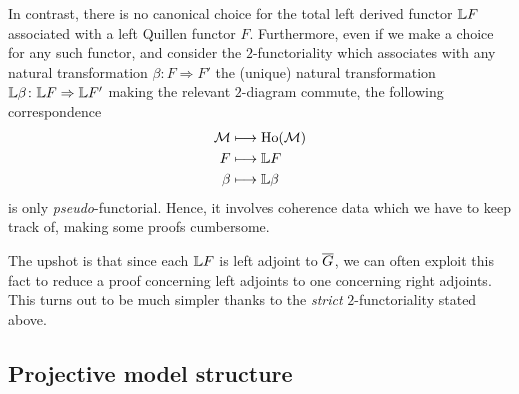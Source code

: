 \begin{paragr}
  In contrast, there is no canonical choice for the total left derived functor $\mathbb{L} F$ associated with
  a left Quillen functor $F$. Furthermore, even if we make a choice for any such
  functor, and consider the $2$\nbd-functoriality which associates with
  any natural transformation $\beta \colon F \Rightarrow F'$ the (unique) natural
  transformation $\mathbb{L} \beta \colon \mathbb{L} F \Rightarrow \mathbb{L} F'$ making
  the relevant $2$\nbd-diagram commute, the
  following correspondence
  \[
  \begin{aligned}
    \mathcal{M} &\longmapsto\mathrm{Ho}(\mathcal{M})\\
    F &\longmapsto\mathbb{L} F\\
    \beta &\longmapsto \mathbb{L} \beta\\
  \end{aligned}
 \] 
  is only \emph{pseudo}-functorial. Hence, it involves coherence 
  data which we have to keep track of, making some proofs cumbersome.

  The upshot is that since each $\mathbb{L} F$ is left adjoint to $\overline{G}$,
  we can often exploit this fact to reduce a proof concerning left
  adjoints to one concerning right adjoints.
  This turns out to be much simpler thanks to the \emph{strict}
  $2$\nbd-functoriality stated above.
    \end{paragr}
\subsection{Projective model structure}\label{projms}

